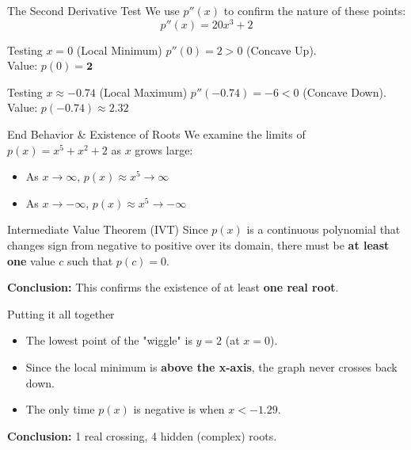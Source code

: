\documentclass{beamer}
\begin{document}
\begin{frame}{ The Second Derivative Test}
    We use $p''(x)$ to confirm the nature of these points:
    $$p''(x) = 20x^3 + 2$$
    
    \begin{block}{Testing $x = 0$ (Local Minimum)}
        $p''(0) = 2 > 0$ (Concave Up). \\
        Value: $p(0) = \mathbf{2}$
    \end{block}
    
    \begin{block}{Testing $x \approx -0.74$ (Local Maximum)}
        $p''(-0.74) = -6 < 0$ (Concave Down). \\
        Value: $p(-0.74) \approx \mathbf{2.32}$
    \end{block}
\end{frame}
\begin{frame}{ End Behavior \& Existence of Roots}
    We examine the limits of $p(x) = x^5 + x^2 + 2$ as $x$ grows large:
    
    \begin{itemize}
        \item As $x \to \infty$, $p(x) \approx x^5 \to \infty$
        \item As $x \to -\infty$, $p(x) \approx x^5 \to -\infty$
    \end{itemize}

    \begin{block}{Intermediate Value Theorem (IVT)}
        Since $p(x)$ is a continuous polynomial that changes sign from negative to positive over its domain, there must be \textbf{at least one} value $c$ such that $p(c) = 0$.
    \end{block}
    
    \textbf{Conclusion:} This confirms the existence of at least \textbf{one real root}.
\end{frame}
\begin{frame}{Putting it all together}
    \begin{itemize}
        \item The lowest point of the "wiggle" is $y = 2$ (at $x=0$).
        \item Since the local minimum is \textbf{above the x-axis}, the graph never crosses back down.
        \item The only time $p(x)$ is negative is when $x < -1.29$.
    \end{itemize}
    
    \begin{center}
        \textbf{Conclusion:} 1 real crossing, 4 hidden (complex) roots.
    \end{center}
\end{frame}
\end{document}
